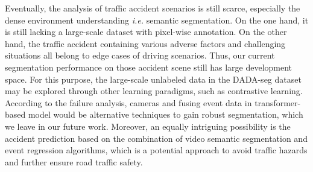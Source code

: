 \documentclass[journal]{IEEEtran}
\begin{document}
Eventually, the analysis of traffic accident scenarios is still scarce, especially the dense environment understanding \textit{i.e.} semantic segmentation. On the one hand, it is still lacking a large-scale dataset with pixel-wise annotation. On the other hand, the traffic accident containing various adverse factors and challenging situations all belong to edge cases of driving scenarios. Thus, our current segmentation performance on those accident scene still has large development space. For this purpose, the large-scale unlabeled data in the DADA-seg dataset may be explored through other learning paradigms, such as contrastive learning.
According to the failure analysis,  cameras and fusing event data in transformer-based model would be alternative techniques to gain robust segmentation, which we leave in our future work.
Moreover, an equally intriguing possibility is the accident prediction based on the combination of video semantic segmentation and event regression algorithms, which is a potential approach to avoid traffic hazards and further ensure road traffic safety.




\end{document}
